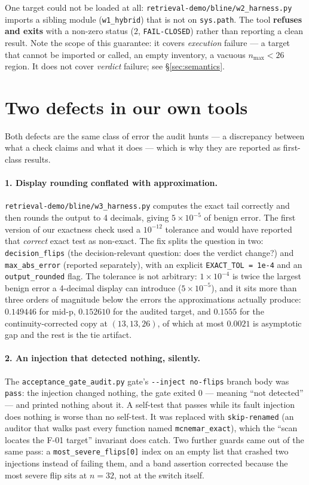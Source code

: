 \documentclass[10pt]{article}
\newcommand{\code}[1]{\texttt{#1}}
\begin{document}
One target could not be loaded at all:
\code{retrieval-demo/bline/w2\_harness.py} imports a sibling module
(\code{w1\_hybrid}) that is not on \code{sys.path}. The tool \textbf{refuses
and exits} with a non-zero status ($2$, \code{FAIL-CLOSED}) rather than
reporting a clean result. Note the scope of this guarantee: it covers
\emph{execution} failure --- a target that cannot be imported or called, an
empty inventory, a vacuous $n_{\max}<26$ region. It does not cover
\emph{verdict} failure; see \S\ref{sec:semantics}.

\section{Two defects in our own tools}\label{sec:selfaudit}

Both defects are the same class of error the audit hunts --- a discrepancy
between what a check claims and what it does --- which is why they are
reported as first-class results.

\paragraph{1. Display rounding conflated with approximation.}
\code{retrieval-demo/bline/w3\_harness.py} computes the exact tail correctly
and then rounds the output to 4 decimals, giving $5\times10^{-5}$ of benign
error. The first version of our exactness check used a $10^{-12}$ tolerance
and would have reported that \emph{correct} exact test as non-exact. The fix
splits the question in two: \code{decision\_flips} (the decision-relevant
question: does the verdict change?) and \code{max\_abs\_error} (reported
separately), with an explicit \code{EXACT\_TOL = 1e-4} and an
\code{output\_rounded} flag. The tolerance is not arbitrary: $1\times10^{-4}$
is twice the largest benign error a 4-decimal display can introduce
($5\times10^{-5}$), and it sits more than three orders of magnitude below the
errors the approximations actually produce: $0.149446$ for mid-p, $0.152610$
for the audited target, and $0.1555$ for the continuity-corrected copy at
$(13,13,26)$, of which at most $0.0021$ is asymptotic gap and the rest is the
tie artifact.

\paragraph{2. An injection that detected nothing, silently.}
The \code{acceptance\_gate\_audit.py} gate's \code{-{}-inject no-flips} branch
body was \code{pass}: the
injection changed nothing, the gate exited 0 --- meaning ``not detected'' ---
and printed nothing about it. A self-test that passes while its fault
injection does nothing is worse than no self-test. It was replaced with
\code{skip-renamed} (an auditor that walks past every function named
\code{mcnemar\_exact}), which the ``scan locates the F-01 target'' invariant
does catch. Two further guards came out of the same pass: a
\code{most\_severe\_flips[0]} index on an empty list that crashed two
injections instead of failing them, and a band assertion corrected because the
most severe flip sits at $n{=}32$, not at the switch itself.
\end{document}
